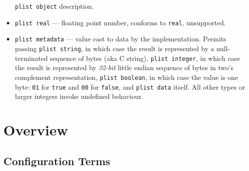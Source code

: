 \documentclass[]{article}
\begin{document}
\begin{itemize}
  \texttt{plist\ object} description.
\item
  \texttt{plist\ real} --- floating point number, conforms to
  \texttt{real}, unsupported.
\item
  \texttt{plist\ metadata} --- value cast to data by the implementation.
  Permits passing \texttt{plist\ string}, in which case the result is
  represented by a null-terminated sequence of bytes (aka C string),
  \texttt{plist\ integer}, in which case the result is represented by
  \emph{32-bit} little endian sequence of bytes in two's complement
  representation, \texttt{plist\ boolean}, in which case the value is
  one byte: \texttt{01} for \texttt{true} and \texttt{00} for
  \texttt{false}, and \texttt{plist\ data} itself. All other types or
  larger integers invoke undefined behaviour.
\end{itemize}

\section{Overview}\label{configuration-overview}

\subsection{Configuration Terms}\label{configuration-terms}
\end{document}
